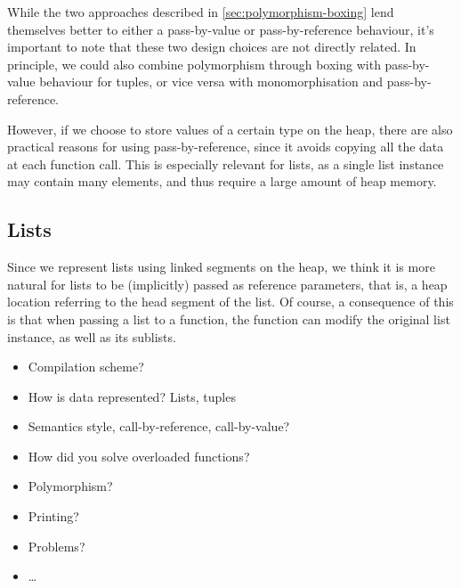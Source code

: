 While the two approaches described in \cref{sec:polymorphism-boxing} lend
themselves better to either a pass-by-value or pass-by-reference behaviour, it's
important to note that these two design choices are not directly related.
In principle, we could also combine polymorphism through boxing with
pass-by-value behaviour for tuples, or vice versa with monomorphisation and
pass-by-reference.

However, if we choose to store values of a certain type on the heap, there are
also practical reasons for using pass-by-reference, since it avoids copying all
the data at each function call.
This is especially relevant for lists, as a single list instance may contain
many elements, and thus require a large amount of heap memory.


\subsection{Lists}
Since we represent lists using linked segments on the heap, we think it is more
natural for lists to be (implicitly) passed as reference parameters, that is, a
heap location referring to the head segment of the list.
Of course, a consequence of this is that when passing a list to a function, the
function can modify the original list instance, as well as its sublists.








\begin{todoenv}
  \begin{itemize}
    \item Compilation scheme?
    \item How is data represented? Lists, tuples
    \item Semantics style, call-by-reference, call-by-value?
    \item How did you solve overloaded functions?
    \item Polymorphism?
    \item Printing?
    \item Problems?
    \item\ldots
  \end{itemize}
\end{todoenv}

